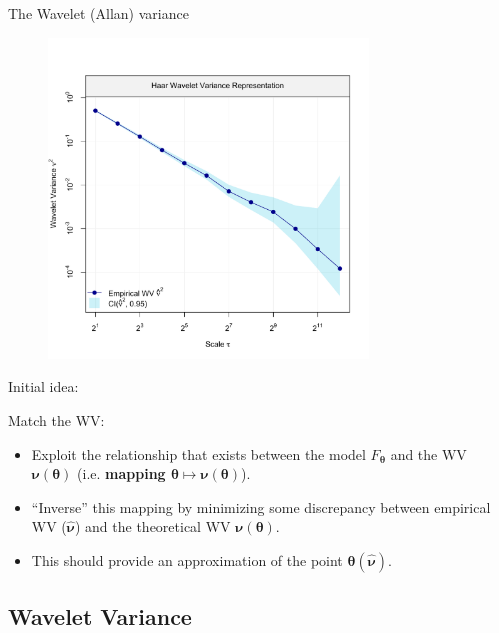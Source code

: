 \documentclass[envcountsect,usenames,dvipsnames]{beamer}
\theoremstyle{mystyle}
\begin{document}
\begin{frame}{The Wavelet (Allan) variance}
	\vspace{-0.85cm}
	\begin{figure}
	    \centering
	  \includegraphics[width = 8.5cm]{Images/WN}
	\end{figure}
\end{frame}

\begin{frame}{Initial idea:}
	\begin{alertblock}{Match the WV:}
		\begin{itemize}
			\item Exploit the relationship that exists between the model $F_{\bm{\theta}}$ and the WV $\bm{\nu}(\bm{\theta})$ (i.e. \textbf{{\color{beamer@UIUCblue} mapping $\bm{\theta} \mapsto \bm{\nu}(\bm{\theta})$}}).
			\item ``Inverse'' this mapping by minimizing some discrepancy between empirical WV ($\hat{\bm{\nu}}$) and the theoretical WV $\bm{\nu}(\bm{\theta})$.
			\item This should provide an approximation of the point $\bm{\theta}(\hat{\bm{\nu}})$.
		\end{itemize}
	\end{alertblock}
\end{frame}

\subsection{Wavelet Variance}
\end{document}
